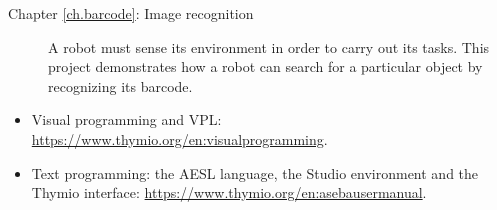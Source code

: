 \begin{description}
\item[Chapter \ref{ch.barcode}: Image recognition] A robot must sense
its environment in order to carry out its tasks. This project
demonstrates how a robot can search for a particular object by
recognizing its barcode.

\end{description}

\newpage




\begin{itemize}
\item Visual programming and VPL:
\href{https://www.thymio.org/en:visualprogramming}{https://www.thymio.org/en:visualprogramming}.

\item Text programming: the AESL language, the Studio environment and the Thymio interface:
\href{https://www.thymio.org/en:asebausermanual}{https://www.thymio.org/en:asebausermanual}.
\end{itemize}
